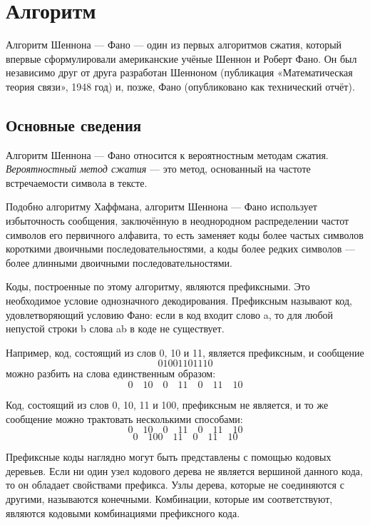 \documentclass{article}
\begin{document}
\newpage
\section{Алгоритм}
Алгоритм Шеннона --- Фано --- один из первых алгоритмов сжатия, который впервые сформулировали 
американские учёные Шеннон и Роберт Фано. Он был независимо друг от друга разработан Шенноном 
(публикация «Математическая теория связи», 1948 год) и, позже, Фано (опубликовано как технический отчёт).

\subsection{Основные сведения}

Алгоритм Шеннона --- Фано относится к вероятностным методам сжатия. 
\textit{Вероятностный метод сжатия} --- это метод, основанный на частоте встречаемости символа в тексте.

Подобно алгоритму Хаффмана, алгоритм Шеннона — Фано использует избыточность сообщения, 
заключённую в неоднородном распределении частот символов его первичного алфавита, 
то есть заменяет коды более частых символов короткими двоичными последовательностями, 
а коды более редких символов --- более длинными двоичными последовательностями. 

Коды, построенные по этому алгоритму, являются префиксными. Это необходимое условие 
однозначного декодирования. Префиксным называют код, удовлетворяющий условию Фано: 
если в код входит слово a, то для любой непустой строки b слова ab в коде не существует.

Например, код, состоящий из слов 0, 10 и 11, является префиксным, и сообщение
$$
01001101110
$$
можно разбить на слова единственным образом:
$$
0\quad10\quad0\quad11\quad0\quad11\quad10
$$

Код, состоящий из слов 0, 10, 11 и 100, префиксным не является, и то же 
сообщение можно трактовать несколькими способами:
$$
0\quad10\quad0\quad11\quad0\quad11\quad10
$$$$
0\quad100\quad11\quad0\quad11\quad10
$$

Префиксные коды наглядно могут быть представлены с помощью кодовых деревьев. 
Если ни один узел кодового дерева не является вершиной данного кода, то он обладает 
свойствами префикса. Узлы дерева, которые не соединяются с другими, называются конечными. 
Комбинации, которые им соответствуют, являются кодовыми комбинациями префиксного кода.

\newpage
\end{document}
